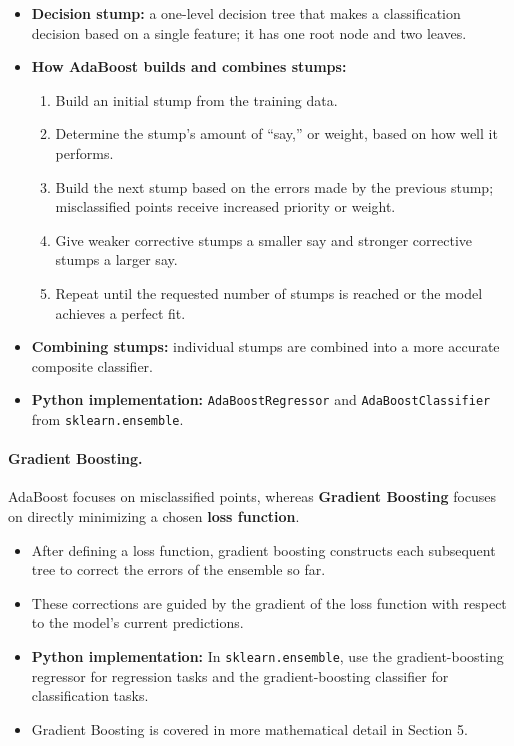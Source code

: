 \documentclass[12pt,openany]{book}
\begin{document}
\begin{itemize}[leftmargin=*]
    \item \textbf{Decision stump:} a one-level decision tree that makes a classification decision based on a single feature; it has one root node and two leaves.
    \item \textbf{How AdaBoost builds and combines stumps:}
    \begin{enumerate}[leftmargin=*]
        \item Build an initial stump from the training data.
        \item Determine the stump's amount of ``say,'' or weight, based on how well it performs.
        \item Build the next stump based on the errors made by the previous stump; misclassified points receive increased priority or weight.
        \item Give weaker corrective stumps a smaller say and stronger corrective stumps a larger say.
        \item Repeat until the requested number of stumps is reached or the model achieves a perfect fit.
    \end{enumerate}
    \item \textbf{Combining stumps:} individual stumps are combined into a more accurate composite classifier.
    \item \textbf{Python implementation:} \texttt{AdaBoostRegressor} and \texttt{AdaBoostClassifier} from \texttt{sklearn.ensemble}.
\end{itemize}

\paragraph{Gradient Boosting.}
AdaBoost focuses on misclassified points, whereas \textbf{Gradient Boosting} focuses on directly minimizing a chosen \textbf{loss function}.

\begin{itemize}[leftmargin=*]
    \item After defining a loss function, gradient boosting constructs each subsequent tree to correct the errors of the ensemble so far.
    \item These corrections are guided by the gradient of the loss function with respect to the model's current predictions.
    \item \textbf{Python implementation:} In \texttt{sklearn.ensemble}, use the gradient-boosting regressor for regression tasks and the gradient-boosting classifier for classification tasks.
    \item Gradient Boosting is covered in more mathematical detail in Section 5.
\end{itemize}
\end{document}
